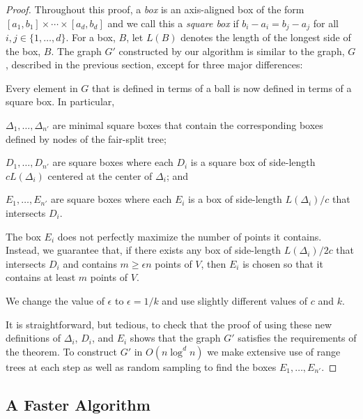 \documentclass{patmorin}
\begin{document}
\begin{proof}
  Throughout this proof, a \emph{box} is an axis-aligned box of the form
  $[a_1,b_1]\times\cdots\times[a_d,b_d]$ and we call this a \emph{square
  box} if $b_i-a_i=b_j-a_j$ for all $i,j\in\{1,\ldots,d\}$. For a box,
  $B$, let $L(B)$ denotes the length of the longest side of the box, $B$.
  The graph $G'$ constructed by our algorithm is similar to the graph,
  $G$, described in the previous section, except for three major
  differences:
  \begin{compactenum}
     \item Every element in $G$ that is defined in terms of a ball is
     now defined in terms of a square box.  In particular,
     \begin{compactenum}
       \item $\Delta_1,\ldots,\Delta_{n'}$ are minimal square boxes that contain
         the corresponding boxes defined by nodes of the fair-split tree;
       \item $D_1,\ldots,D_{n'}$ are square boxes where each $D_i$
         is a square box of side-length $cL(\Delta_i)$ centered at the
         center of $\Delta_i$; and
       \item $E_1,\ldots,E_{n'}$ are square boxes where each $E_i$ is a box of
         side-length $L(\Delta_i)/c$ that intersects $D_i$.
     \end{compactenum}
     \item The box $E_i$ does not perfectly maximize the number of points
       it contains. Instead, we guarantee that, if there exists any
       box of side-length $L(\Delta_i)/2c$ that intersects $D_i$ and
       contains $m\ge \epsilon n$ points of $V$, then $E_i$ is chosen so that
       it contains at least $m$ points of $V$.
     \item We change the value of $\epsilon$ to $\epsilon = 1/k$
      and use slightly different values of $c$ and $k$.
  \end{compactenum} 
  It is straightforward, but tedious, to check that the proof of
   using these new definitions of $\Delta_i$, $D_i$,
  and $E_i$ shows that the graph $G'$ satisfies the requirements of the
  theorem.  To construct $G'$ in $O(n\log^d n)$ we make extensive use
  of range trees \cite{bentley:multidimensional,luecker:data} at each
  step as well as random sampling to find the boxes $E_1,\ldots,E_{n'}$.
\end{proof}

\subsection{A Faster Algorithm}
\end{document}
